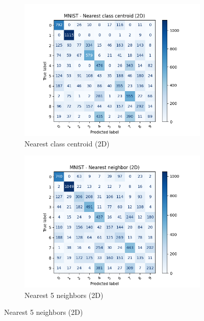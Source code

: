 \begin{figure}[htbp]
        \begin{subfigure}[b]{.33\linewidth}
                \centering
                \includegraphics[width=1\linewidth]{../source/mnist/pictures/nearestClassCentroid-confusion-2d.png}
                \caption{Nearest class centroid (2D)}
                \label{fig:mnist-confusion-ncc-2}
            \end{subfigure}%
            \begin{subfigure}[b]{0.33\linewidth}
                \centering
                \includegraphics[width=1\linewidth]{../source/mnist/pictures/nearestNeighbor-5-confusion-2d.png}
                \caption{Nearest 5 neighbors (2D)}
                \label{fig:mnist-confusion-nn-2}
            \end{subfigure}

\end{figure}
